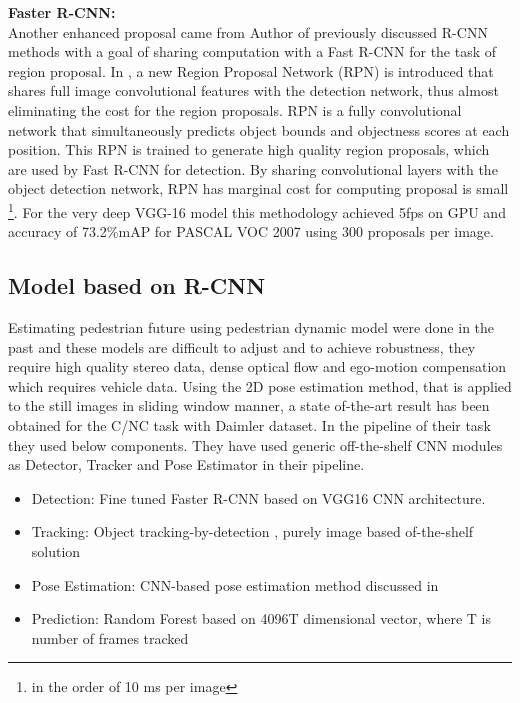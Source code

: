 \newpara \textbf{Faster R-CNN:} \\  
Another enhanced proposal came from Author of previously discussed R-CNN methods with a goal of sharing computation with a Fast R-CNN for the task of region proposal. In \cite{ren2015faster}, a new Region Proposal Network (RPN) is introduced that shares full image convolutional features with the detection network, thus almost eliminating the cost for the region proposals. RPN is a fully convolutional network that simultaneously predicts object bounds and objectness scores at each position. This RPN is trained to generate high quality region proposals, which are used by Fast R-CNN for detection. By sharing convolutional layers with the object detection network, RPN has marginal cost for computing proposal is small \footnote{in the order of 10 ms per image}. For the very deep VGG-16 model this methodology achieved 5fps on GPU and accuracy of 73.2\%mAP for PASCAL VOC 2007 using 300 proposals per image. 

\subsection{Model based on R-CNN}
\newpara Estimating pedestrian future using pedestrian dynamic model were done in the past and these models are difficult to adjust and to achieve robustness, they require high quality stereo data, dense optical flow and ego-motion compensation which requires vehicle data.  Using the 2D pose estimation method, that is applied to the still images in sliding window manner, a state of-the-art result has been obtained\cite{fang2018pedestrian} for the C/NC task with Daimler dataset. In the pipeline of their task they used below components. They have used generic off-the-shelf CNN modules as Detector, Tracker and Pose Estimator in their pipeline.

\begin{itemize}
	\item Detection: Fine tuned Faster R-CNN \cite{ren2015faster} based on VGG16 CNN architecture. 
	\item Tracking: Object tracking-by-detection \cite{wojke2017simple}, purely image based of-the-shelf solution 
	\item Pose Estimation: CNN-based pose estimation method discussed in \cite{cao2017realtime}
	\item Prediction: Random Forest based on 4096T dimensional vector, where T is number of frames tracked
\end{itemize}

